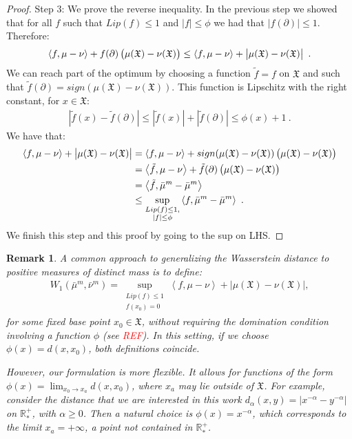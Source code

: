 \documentclass[11pt,a4paper]{article}
\newcommand{\RRP}{\mathbb{R}^+_*}
\newcommand{\XF}{\mathfrak{X}}
\newcommand{\brac}[1]{\left\langle#1\right\rangle}
\newtheorem{remark}[theorem]{Remark}
\begin{document}
\begin{proof}
    Step $3$: We prove the reverse inequality. In the previous step we showed that for all $f$ such that $Lip(f) \leq 1$ and $|f| \leq \phi$ we had that $|f(\partial)| \leq 1$. Therefore:
    \begin{align*}
        \brac{f,\mu - \nu} + f(\partial) \left(\mu(\XF) - \nu(\XF)\vphantom{A^2}\right) \leq \brac{f,\mu - \nu} + \left|\mu(\XF) - \nu(\XF)\vphantom{A^2}\right|\ .
    \end{align*}
    We can reach part of the optimum by choosing a function $\tilde{f} = f$ on $\XF$ and such that $\tilde{f}(\partial) = sign(\mu(\XF) - \nu(\XF))$. This function is Lipschitz with the right constant, for $x \in \XF$:
    \begin{align*}
        \left|\tilde{f}(x) - \tilde{f}(\partial)\right| \leq  \left|\tilde{f}(x)\right| + \left|\tilde{f}(\partial)\right| \leq \phi(x) + 1\ .
    \end{align*}
    We have that:
    \begin{align*}
        \brac{f,\mu - \nu} + \left|\vphantom{A^2}\mu(\XF) - \nu(\XF) \right| &= \brac{f,\mu - \nu} + sign(\mu(\XF) - \nu(\XF))\left(\vphantom{A^2}\mu(\XF) - \nu(\XF) \right)\\
        &=  \brac{\tilde{f},\mu - \nu} + \tilde{f}(\partial)\left(\vphantom{A^2}\mu(\XF) - \nu(\XF) \right)\\
        &= \brac{\tilde{f},\bar{\mu}^m - \bar{\mu}^m} \\
        &\leq \sup\limits_{\substack{Lip(f) \leq 1,\\ |f| \leq \phi}} \brac{f,\bar{\mu}^m - \bar{\mu}^m} \ .
    \end{align*}
    We finish this step and this proof by going to the sup on LHS.
\end{proof}
\begin{remark}
A common approach to generalizing the Wasserstein distance to positive measures of distinct mass is to define:
\begin{align*}
    W_1(\bar{\mu}^m, \bar{\nu}^m) = \sup_{\substack{Lip(f) \leq 1\\ f(x_0) = 0}} \brac{f, \mu - \nu} + \left| \mu(\XF) - \nu(\XF) \right|,
\end{align*}
for some fixed base point $x_0 \in \XF$, without requiring the domination condition involving a function $\phi$ (see \textcolor{red}{REF}). In this setting, if we choose $\phi(x) = d(x, x_0)$, both definitions coincide.

However, our formulation is more flexible. It allows for functions of the form $\phi(x) = \lim_{x_0 \to x_a} d(x, x_0)$, where $x_a$ may lie outside of $\XF$. For example, consider the distance that we are interested in this work \(d_\alpha(x, y) = |x^{-\alpha} - y^{-\alpha}|\) on \(\RRP\), with \(\alpha \geq 0\). Then a natural choice is \(\phi(x) = x^{-\alpha}\), which corresponds to the limit \(x_a = +\infty\), a point not contained in \(\RRP\).
\end{remark}
\end{document}
